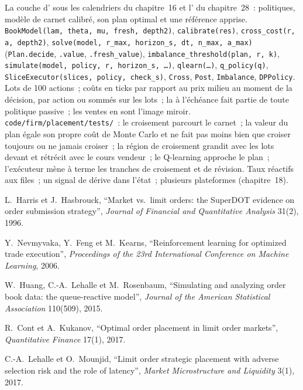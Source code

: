 \begin{build}
 La couche d' sous les calendriers du chapitre~16 et l' du chapitre~28~: politiques, modèle de carnet calibré, son plan optimal
et une référence apprise.
 \texttt{BookModel(lam, theta, mu, fresh, depth2)}, \texttt{calibrate(res)}, \texttt{cross\_cost(r, a, depth2)},
\texttt{solve(model, r\_max, horizon\_s, dt, n\_max, a\_max)} (\texttt{Plan.decide}, \texttt{.value}, \texttt{.fresh\_value}),
\texttt{imbalance\_threshold(plan, r, k)}, \texttt{simulate(model, policy, r, horizon\_s, \dots)}, \texttt{qlearn(\dots)}, \texttt{q\_policy(q)},
\texttt{SliceExecutor(slices, policy, check\_s)}, \texttt{Cross}, \texttt{Post}, \texttt{Imbalance}, \texttt{DPPolicy}.
 Lots de 100 actions~; coûts en ticks par rapport au prix milieu au moment de la décision, par action ou sommés sur les lots~; la  à l'échéance fait
partie de toute politique passive~; les ventes en sont l'image miroir.
 \texttt{code/firm/placement/tests/}~: le croisement parcourt le carnet~; la valeur du plan égale son propre coût de Monte Carlo et ne fait pas moins bien que
croiser toujours ou ne jamais croiser~; la région de croisement grandit avec les lots devant et rétrécit avec le cours vendeur~; le Q-learning approche le plan~; l'exécuteur
mène à terme les tranches de croisement et de révision.
 Taux réactifs aux files~; un signal de dérive dans l'état~; plusieurs plateformes (chapitre~18).
\end{build}

\begin{omsources}
\item L.~Harris et J.~Hasbrouck, ``Market vs.\ limit orders: the SuperDOT evidence on order submission strategy'', \emph{Journal of Financial and
Quantitative Analysis} 31(2), 1996.
\item Y.~Nevmyvaka, Y.~Feng et M.~Kearns, ``Reinforcement learning for optimized trade execution'', \emph{Proceedings of the 23rd International
Conference on Machine Learning}, 2006.
\item W.~Huang, C.-A.~Lehalle et M.~Rosenbaum, ``Simulating and analyzing order book data: the queue-reactive model'', \emph{Journal of the American
Statistical Association} 110(509), 2015.
\item R.~Cont et A.~Kukanov, ``Optimal order placement in limit order markets'', \emph{Quantitative Finance} 17(1), 2017.
\item C.-A.~Lehalle et O.~Mounjid, ``Limit order strategic placement with adverse selection risk and the role of latency'', \emph{Market
Microstructure and Liquidity} 3(1), 2017.
\end{omsources}

